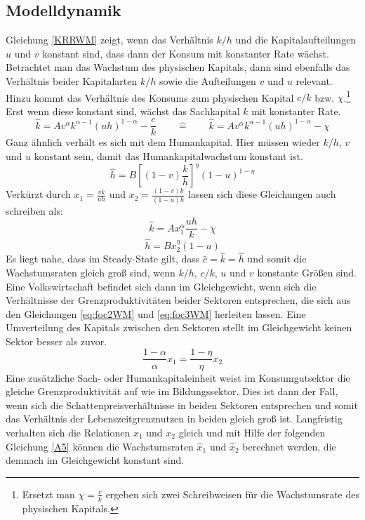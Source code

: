 \subsection*{Modelldynamik}\label{sec:Modelldynamik}
Gleichung \eqref{KRRWM} zeigt, wenn das Verhältnis $k/h$ und die Kapitalaufteilungen $u$ und $v$ konstant sind, dass dann der Konsum mit konstanter Rate wächst. 
Betrachtet man das Wachstum des physischen Kapitals, dann sind ebenfalls das Verhältnis beider Kapitalarten $k/h$ sowie die Aufteilungen $v$ und $u$ relevant. Hinzu kommt das Verhältnis des Konsums zum physischen Kapital $c/k$ bzw. $\chi$.\footnote{Ersetzt man $\chi=\frac{c}{k}$ ergeben sich zwei Schreibweisen für die Wachstumsrate des physischen Kapitals.} Erst wenn diese konstant sind, wächst das Sachkapital $k$ mit konstanter Rate.
%
\begin{equation}
	\hat{k}=Av^\alpha k^{\alpha-1}(uh)^{1-\alpha}-\frac{c}{k} \qquad \hat{=} \qquad
	\hat{k}=Av^\alpha k^{\alpha-1}(uh)^{1-\alpha}-\chi 
\end{equation}
%
Ganz ähnlich verhält es sich mit dem Humankapital. Hier müssen wieder $k/h$, $v$ und $u$ konstant sein, damit das Humankapitalwachstum konstant ist. 
%
\begin{equation}
	\hat{h}=B\left[(1-v)\frac{k}{h}\right]^{\eta}(1-u)^{1-\eta}
\end{equation}
%
Verkürzt durch $x_1=\frac{vk}{uh}$ und $x_2=\frac{(1-v)k}{(1-u)h}$ lassen sich diese Gleichungen auch schreiben als:
%
\begin{equation}
	\boxed{\hat{k}=Ax_1^\alpha \frac{uh}{k}-\chi}
\end{equation}
%
\begin{equation}
	\boxed{\hat{h}=Bx_2^\eta(1-u)}
\end{equation}
%
Es liegt nahe, dass im Steady-State gilt, dass $\hat{c}=\hat{k}=\hat{h}$ und somit die Wachstumsraten gleich groß sind, wenn $k/h$, $c/k$, $u$ und $v$ konstante Größen sind. 
%
Eine Volkswirtschaft befindet sich dann im Gleichgewicht, wenn sich die Verhältnisse der Grenzproduktivitäten beider Sektoren entsprechen, die sich aus den Gleichungen \eqref{eq:foc2WM} und \eqref{eq:foc3WM} herleiten lassen. Eine Umverteilung des Kapitals zwischen den Sektoren stellt im Gleichgewicht keinen Sektor besser als zuvor. 
%
\begin{equation}
	\boxed{\frac{1-\alpha}{\alpha}x_1=\frac{1-\eta}{\eta}x_2}
\end{equation}
%
Eine zusätzliche Sach- oder Humankapitaleinheit weist im Konsumgutsektor die gleiche Grenzproduktivität auf wie im Bildungssektor. Dies ist dann der Fall, wenn sich die Schattenpreisverhältnisse in beiden Sektoren entsprechen und somit das Verhältnis der Lebenszeitgrenznutzen in beiden gleich groß ist. Langfristig verhalten sich die Relationen $x_1$ und $x_2$ gleich und mit Hilfe der folgenden Gleichung \eqref{A5} können die Wachstumsraten $\hat{x}_1$ und $\hat{x}_2$ berechnet werden, die demnach im Gleichgewicht konstant sind. 
